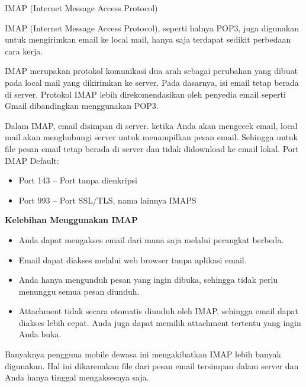 \documentclass[a4paper,12pt]{report}
\begin{document}
\begin{myEnumerate}
 \par
\noindent 
\item IMAP (Internet Message Access Protocol) \par
IMAP (Internet Message Access Protocol), seperti halnya POP3, juga digunakan untuk mengirimkan email ke local mail, hanya saja terdapat sedikit perbedaan cara kerja. \par
\vspace{12pt}
IMAP merupakan protokol komunikasi dua arah sebagai perubahan yang dibuat pada local mail yang dikirimkan ke server. Pada dasarnya, isi email tetap berada di server. Protokol IMAP lebih direkomendasikan oleh penyedia email seperti Gmail dibandingkan menggunakan POP3. \par
\vspace{12pt}
Dalam IMAP, email disimpan di server. ketika Anda akan mengecek email, local mail akan menghubungi server untuk menampilkan pesan email. Sehingga untuk file pesan email tetap berada di server dan tidak didownload ke email lokal. Port IMAP Default: \par
\noindent 
\begin{itemize}
\item Port 143 – Port tanpa dienkripsi \par
\noindent 
\item Port 993 – Port SSL/TLS, nama lainnya IMAPS\end{itemize}
 \par
\vspace{12pt}
\textbf{Kelebihan Menggunakan IMAP} \par
\noindent 
\begin{itemize}
\item Anda dapat mengakses email dari mana saja melalui perangkat berbeda. \par
\noindent 
\item Email dapat diakses melalui web browser tanpa aplikasi email. \par
\noindent 
\item Anda hanya mengunduh pesan yang ingin dibuka, sehingga tidak perlu menunggu semua pesan diunduh. \par
\noindent 
\item Attachment tidak secara otomatis diunduh oleh IMAP, sehingga email dapat diakses lebih cepat. Anda juga dapat memilih attachment tertentu yang ingin Anda buka.\end{itemize}
 \par
Banyaknya pengguna mobile dewasa ini mengakibatkan IMAP lebih banyak digunakan. Hal ini dikarenakan file dari pesan email tersimpan dalam server dan Anda hanya tinggal mengaksesnya saja. \par

\end{myEnumerate}
\end{document}
